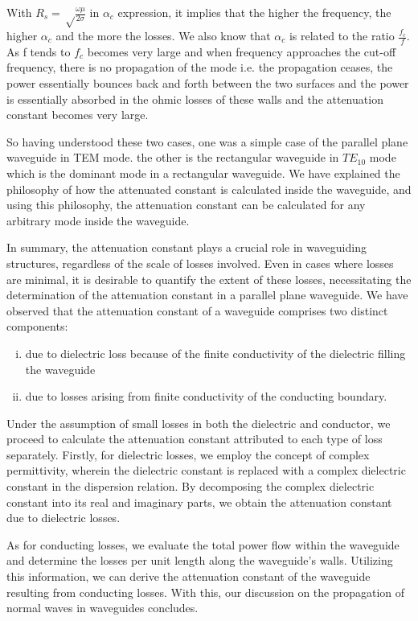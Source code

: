 With $R_s=\sqrt\frac{\omega\mu}{2\sigma}$ in $\alpha_{c}$ expression, it implies that the higher the frequency, the higher $\alpha_{c}$ and the more the losses. We also know that $\alpha_{c}$ is related to the ratio $\frac{f_c}{f}$. As f tends to $f_c$ becomes very large and when frequency approaches the cut-off frequency, there is no propagation of the mode i.e. the propagation ceases, the power essentially bounces back and forth between the two surfaces and the power is essentially absorbed in the ohmic losses of these walls and the attenuation constant becomes very large.

So having understood these two cases, one was a simple case of the parallel plane waveguide in TEM mode. the other is the rectangular waveguide in $TE_{10}$ mode which is the dominant mode in a rectangular waveguide. We have explained the philosophy of how the attenuated constant is calculated inside the waveguide, and using this philosophy, the attenuation constant can be calculated for any arbitrary mode inside the waveguide.

In summary, the attenuation constant plays a crucial role in waveguiding structures, regardless of the scale of losses involved. Even in cases where losses are minimal, it is desirable to quantify the extent of these losses, necessitating the determination of the attenuation constant in a parallel plane waveguide. We have observed that the attenuation constant of a waveguide comprises two distinct components:
\begin{enumerate}[(i)]
\item due to dielectric loss because of the finite conductivity of the dielectric filling the waveguide
\item due to losses arising from finite conductivity of the conducting boundary.
\end{enumerate}
Under the assumption of small losses in both the dielectric and conductor, we proceed to calculate the attenuation constant attributed to each type of loss separately. Firstly, for dielectric losses, we employ the concept of complex permittivity, wherein the dielectric constant is replaced with a complex dielectric constant in the dispersion relation. By decomposing the complex dielectric constant into its real and imaginary parts, we obtain the attenuation constant due to dielectric losses.

As for conducting losses, we evaluate the total power flow within the waveguide and determine the losses per unit length along the waveguide's walls. Utilizing this information, we can derive the attenuation constant of the waveguide resulting from conducting losses. With this, our discussion on the propagation of normal waves in waveguides concludes.

